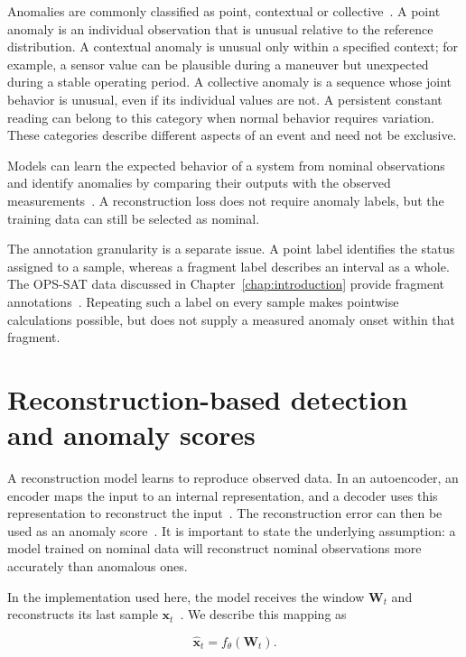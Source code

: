 Anomalies are commonly classified as point, contextual or
collective~\cite{Chandola2009AnomalySurvey}. A point anomaly is an individual
observation that is unusual relative to the reference distribution. A
contextual anomaly is unusual only within a specified context; for example, a
sensor value can be plausible during a maneuver but unexpected during a stable
operating period. A collective anomaly is a sequence whose joint behavior is
unusual, even if its individual values are not. A persistent constant reading
can belong to this category when normal behavior requires variation. These
categories describe different aspects of an event and need not be exclusive.

Models can learn the expected behavior of a system from nominal
observations and identify anomalies by comparing their outputs
with the observed measurements~\cite{Hundman2018Spacecraft}.
A reconstruction loss does not require anomaly labels, but the
training data can still be selected as nominal.

The annotation granularity is a separate issue. A point label identifies the
status assigned to a sample, whereas a fragment label describes an interval as
a whole. The \ac{OPS-SAT} data discussed in Chapter~\ref{chap:introduction}
provide fragment annotations~\cite{Ruszczak2025OPSSAT}. Repeating such a label
on every sample makes pointwise calculations possible, but does not supply a
measured anomaly onset within that fragment.

\section{Reconstruction-based detection and anomaly scores}
\label{sec:background-reconstruction}

A reconstruction model learns to reproduce observed data.
In an autoencoder, an encoder maps the input to an internal
representation, and a decoder uses this representation to
reconstruct the input~\cite{Goodfellow2016DeepLearning}.
The reconstruction error can then be used as an anomaly
score~\cite{Tuli2022TranAD}.
It is important to state the underlying assumption: a model trained on nominal data
will reconstruct nominal observations more accurately than
anomalous ones.

In the implementation used here, the model receives the window
$\mathbf{W}_t$ and reconstructs its last sample
$\mathbf{x}_t$~\cite{TranADPlusReferenceCode}.
We describe this mapping as

\begin{equation}
  \widehat{\mathbf{x}}_t = f_{\theta}(\mathbf{W}_t).
  \label{eq:background-reconstruction}
\end{equation}

